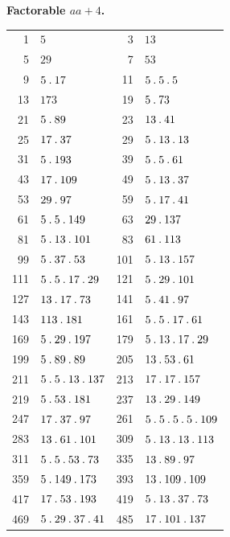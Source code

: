 \par\medskip{}
\centerline{\textbf{Factorable $aa+4$.}}\nobreak\smallskip
\begingroup\small\setlength{\tabcolsep}{4pt}
\begin{longtable}{@{}r|l@{\qquad}r|l@{}}
1 & $5$ & 3 & $13$\\
5 & $29$ & 7 & $53$\\
9 & $5\mathbin{.} 17$ & 11 & $5\mathbin{.} 5\mathbin{.} 5$\\
13 & $173$ & 19 & $5\mathbin{.} 73$\\
21 & $5\mathbin{.} 89$ & 23 & $13\mathbin{.} 41$\\
25 & $17\mathbin{.} 37$ & 29 & $5\mathbin{.} 13\mathbin{.} 13$\\
31 & $5\mathbin{.} 193$ & 39 & $5\mathbin{.} 5\mathbin{.} 61$\\
43 & $17\mathbin{.} 109$ & 49 & $5\mathbin{.} 13\mathbin{.} 37$\\
53 & $29\mathbin{.} 97$ & 59 & $5\mathbin{.} 17\mathbin{.} 41$\\
61 & $5\mathbin{.} 5\mathbin{.} 149$ & 63 & $29\mathbin{.} 137$\\
81 & $5\mathbin{.} 13\mathbin{.} 101$ & 83 & $61\mathbin{.} 113$\\
99 & $5\mathbin{.} 37\mathbin{.} 53$ & 101 & $5\mathbin{.} 13\mathbin{.} 157$\\
111 & $5\mathbin{.} 5\mathbin{.} 17\mathbin{.} 29$ & 121 & $5\mathbin{.} 29\mathbin{.} 101$\\
127 & $13\mathbin{.} 17\mathbin{.} 73$ & 141 & $5\mathbin{.} 41\mathbin{.} 97$\\
143 & $113\mathbin{.} 181$ & 161 & $5\mathbin{.} 5\mathbin{.} 17\mathbin{.} 61$\\
169 & $5\mathbin{.} 29\mathbin{.} 197$ & 179 & $5\mathbin{.} 13\mathbin{.} 17\mathbin{.} 29$\\
199 & $5\mathbin{.} 89\mathbin{.} 89$ & 205 & $13\mathbin{.} 53\mathbin{.} 61$\\
211 & $5\mathbin{.} 5\mathbin{.} 13\mathbin{.} 137$ & 213 & $17\mathbin{.} 17\mathbin{.} 157$\\
219 & $5\mathbin{.} 53\mathbin{.} 181$ & 237 & $13\mathbin{.} 29\mathbin{.} 149$\\
247 & $17\mathbin{.} 37\mathbin{.} 97$ & 261 & $5\mathbin{.} 5\mathbin{.} 5\mathbin{.} 5\mathbin{.} 109$\\
283 & $13\mathbin{.} 61\mathbin{.} 101$ & 309 & $5\mathbin{.} 13\mathbin{.} 13\mathbin{.} 113$\\
311 & $5\mathbin{.} 5\mathbin{.} 53\mathbin{.} 73$ & 335 & $13\mathbin{.} 89\mathbin{.} 97$\\
359 & $5\mathbin{.} 149\mathbin{.} 173$ & 393 & $13\mathbin{.} 109\mathbin{.} 109$\\
417 & $17\mathbin{.} 53\mathbin{.} 193$ & 419 & $5\mathbin{.} 13\mathbin{.} 37\mathbin{.} 73$\\
469 & $5\mathbin{.} 29\mathbin{.} 37\mathbin{.} 41$ & 485 & $17\mathbin{.} 101\mathbin{.} 137$\\

\end{longtable}
